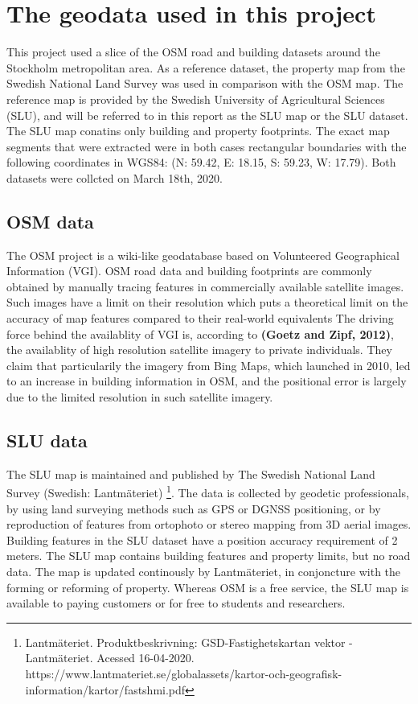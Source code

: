 \documentclass{kththesis}
\begin{document}
\section{The geodata used in this project}

This project used a slice of the OSM road and building datasets around the Stockholm metropolitan area.
As a reference dataset, the property map from the Swedish National Land Survey was used in comparison with the OSM map.
The reference map is provided by the Swedish University of Agricultural Sciences (SLU), and will be referred to in this report as the SLU map or the SLU dataset.
The SLU map conatins only building and property footprints.
The exact map segments that were extracted were in both cases rectangular boundaries with the following coordinates in WGS84: (N: 59.42, E: 18.15, S: 59.23, W: 17.79).
Both datasets were collcted on March 18th, 2020.

\subsection{OSM data}

The OSM project is a wiki-like geodatabase based on Volunteered Geographical Information (VGI).
OSM road data and building footprints are commonly obtained by manually tracing features in commercially available satellite images.
Such images have a limit on their resolution which puts a theoretical limit on the accuracy of map features compared to their real-world equivalents
The driving force behind the availablity of VGI is, according to \textbf{(Goetz and Zipf, 2012)}, the availablity of high resolution satellite imagery to private individuals.
They claim that particularily the imagery from Bing Maps, which launched in 2010, led to an increase in building information in OSM, and the positional error is largely due to the limited resolution in such satellite imagery.

\subsection{SLU data}

The SLU map is maintained and published by The Swedish National Land Survey (Swedish: Lantmäteriet)
\footnote{Lantmäteriet. Produktbeskrivning: GSD-Fastighetskartan vektor - Lantmäteriet. Acessed 16-04-2020. https://www.lantmateriet.se/globalassets/kartor-och-geografisk-information/kartor/fastshmi.pdf}.
The data is collected by geodetic professionals, by using land surveying methods such as GPS or DGNSS positioning, or by reproduction of features from ortophoto or stereo mapping from 3D aerial images.
Building features in the SLU dataset have a position accuracy requirement of 2 meters.
The SLU map contains building features and property limits, but no road data.
The map is updated continously by Lantmäteriet, in conjoncture with the forming or reforming of property.
Whereas OSM is a free service, the SLU map is available to paying customers or for free to students and researchers.
\end{document}

